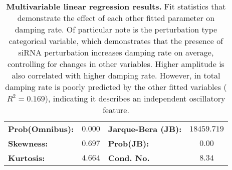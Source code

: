 \documentclass[11pt, letterpaper]{article}
\begin{document}
\begin{table}
\begin{center}
\begin{tabular}{lclc}
\textbf{Prob(Omnibus):} &$  0.000 $& \textbf{  Jarque-Bera (JB):  } &$18459.719$ \\
\textbf{Skewness:}          &$  0.697 $& \textbf{  Prob(JB):          } &$     0.00$ \\
\textbf{Kurtosis:}      &$  4.664 $& \textbf{  Cond. No.          } &$     8.34$ \\
\bottomrule
\end{tabular}
\end{center} 
\caption{{\bfseries Multivariable linear regression results.} Fit statistics that demonstrate the effect of each other fitted parameter on damping rate. Of particular note is the perturbation type categorical variable, which demonstrates that the presence of siRNA perturbation increases damping rate on average, controlling for changes in other variables. Higher amplitude is also correlated with higher damping rate. However, in total damping rate is poorly predicted by the other fitted variables ($R^2 = 0.169$), indicating it describes an independent oscillatory feature.}
\label{tab:ols_reg}
\end{table}
\end{document}
